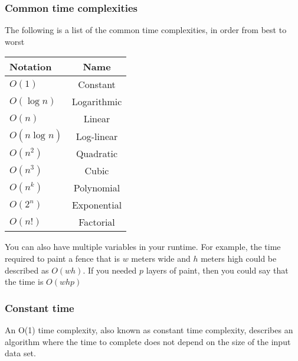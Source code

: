 \documentclass{report}
\begin{document}
    \subsubsection{Common time complexities}
    \bigbreak \noindent 
    The following is a list of the common time complexities, in order from best to worst
    \bigbreak \noindent 
    \begin{center}
        \begin{tabular}{lc}
            Notation & Name \\
        \hline
            $O(1)$ & Constant \\
            $O(\log{n}) $ & Logarithmic \\
            $O(n)$ & Linear \\
            $O(n\log_{}{n}) $ & Log-linear \\
            $O(n^{2}) $ & Quadratic \\
            $O(n^{3}) $ & Cubic \\
            $O(n^{k}) $ & Polynomial \\
            $O(2^{n}) $ & Exponential  \\
            $O(n!) $ & Factorial
        \end{tabular}
    \end{center}
    \bigbreak \noindent 
    You can also have multiple variables in your runtime. For example, the time required to paint a fence that is $w$ meters wide and $h$ meters high could be described as $O(wh)$. If you needed $p$ layers of paint, then you could say that the time is $O(whp)$

    \bigbreak \noindent 
    \subsubsection{Constant time}
    An O(1) time complexity, also known as constant time complexity, describes an algorithm where the time to complete does not depend on the size of the input data set. 
    \bigbreak \noindent 
\end{document}
